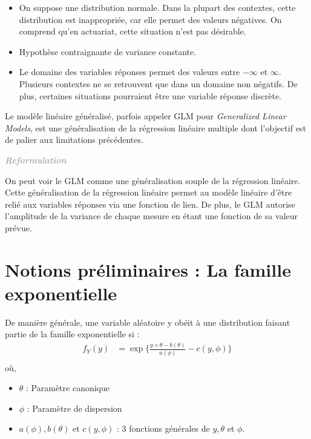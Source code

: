 \documentclass[11pt,french]{report}
\newenvironment{moreInfo}[1]
	{\begin{mdframed}
	\textcolor{darkgray}{\huge \raisebox{-3.5pt}{\faInfo} 
	\hspace{0.5cm} \large\bfseries #1}\\[5pt]
	\normalsize
	\makebox[0.1\textwidth][l]{}	
	\begin{minipage}{10cm}}
	{	\end{minipage}
	\end{mdframed}}
\begin{document}
\bigskip
\begin{itemize}
\item On suppose une distribution normale. Dans la plupart des contextes, cette distribution est inappropriée, car elle permet des valeurs négatives. On comprend qu'en actuariat, cette situation n'est pas désirable.
\item Hypothèse contraignante de variance constante.
\item Le domaine des variables réponses permet des valeurs entre $-\infty$ et $\infty$. Plusieurs contextes ne se retrouvent que dans un domaine non négatifs. De plus, certaines situations pourraient être une variable réponse discrète.
\end{itemize}

\bigskip
Le modèle linéaire généralisé, parfois appeler GLM pour \emph{Generalized Linear Models}, est une généralisation de la régression linéaire multiple dont l'objectif est de palier aux limitations précédentes.

\begin{moreInfo}{\color{Gray}\emph{Reformulation}
     \color{black}}
     On peut voir le GLM comme une généralisation souple de la régression linéaire. Cette généralisation de la régression linéaire permet au modèle linéaire d'être relié aux variables réponses via une fonction de lien. De plus, le GLM autorise l'amplitude de la variance de chaque mesure en étant une fonction de sa valeur prévue.
\end{moreInfo}

\section{Notions préliminaires : La famille exponentielle}
De manière générale, une variable aléatoire y obéit à une distribution faisant partie de la famille exponentielle si :
\begin{align*}
f_Y(y) &= \exp\bigg\lbrace \frac{y \times \theta - b(\theta)}{a(\phi)} - c(y, \phi) \bigg\rbrace \\
\end{align*}
où,
\begin{itemize}
     \item $\theta$ : Paramètre canonique
     \item $\phi $ : Paramètre de dispersion
     \item $a(\phi), b(\theta)$ et $c(y, \phi)$ : 3 fonctions générales de $y, \theta$ et $\phi$.
\end{itemize}
\end{document}
